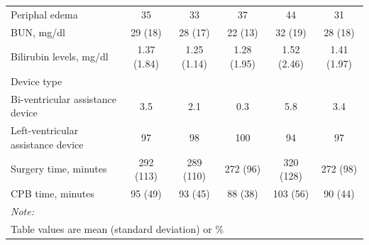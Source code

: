 \documentclass{article}
\begin{document}
\begin{table}
\begin{tabular}{lccccc}
Periphal edema & 35 & 33 & 37 & 44 & 31\\
\addlinespace
BUN, mg/dl & 29 (18) & 28 (17) & 22 (13) & 32 (19) & 28 (18)\\
Bilirubin levels, mg/dl & 1.37 (1.84) & 1.25 (1.14) & 1.28 (1.95) & 1.52 (2.46) & 1.41 (1.97)\\
Device type &  &  &  &  & \\
\hspace{1em}Bi-ventricular assistance device & 3.5 & 2.1 & 0.3 & 5.8 & 3.4\\
\hspace{1em}Left-ventricular assistance device & 97 & 98 & 100 & 94 & 97\\
\addlinespace
Surgery time, minutes & 292 (113) & 289 (110) & 272 (96) & 320 (128) & 272 (98)\\
CPB time, minutes & 95 (49) & 93 (45) & 88 (38) & 103 (56) & 90 (44)\\
\bottomrule
\multicolumn{6}{l}{\rule{0pt}{1em}\textit{Note: }}\\
\multicolumn{6}{l}{\rule{0pt}{1em}Table values are mean (standard deviation) or \%}\\
\end{tabular}

\end{table}

\clearpage
\end{document}
